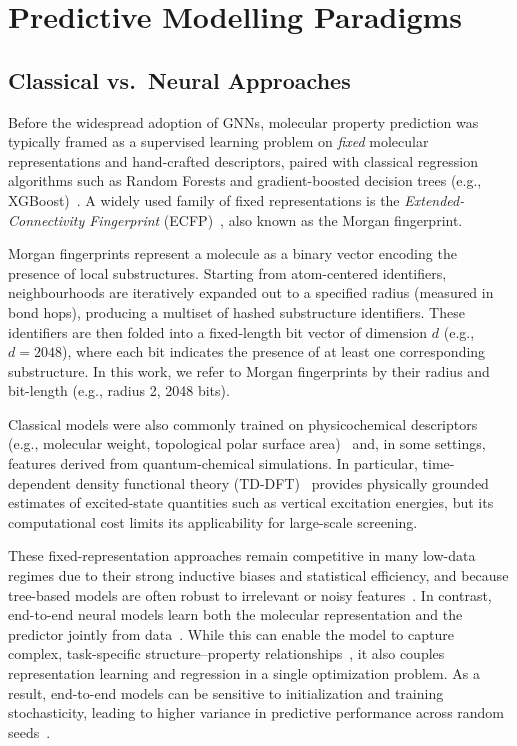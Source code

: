 \section{Predictive Modelling Paradigms}

\subsection{Classical vs.\ Neural Approaches}

Before the widespread adoption of GNNs, molecular property prediction was typically framed as a supervised learning problem on \emph{fixed} molecular representations and hand-crafted descriptors, paired with classical regression algorithms such as Random Forests and gradient-boosted decision trees (e.g., XGBoost)~\cite{breiman2001random, friedman2001greedy, chen2016xgboost}. A widely used family of fixed representations is the \emph{Extended-Connectivity Fingerprint} (ECFP)~\cite{rogers2010extended}, also known as the Morgan fingerprint. 

Morgan fingerprints represent a molecule as a binary vector encoding the presence of local substructures. Starting from atom-centered identifiers, neighbourhoods are iteratively expanded out to a specified radius (measured in bond hops), producing a multiset of hashed substructure identifiers. These identifiers are then folded into a fixed-length bit vector of dimension $d$ (e.g., $d=2048$), where each bit indicates the presence of at least one corresponding substructure. In this work, we refer to Morgan fingerprints by their radius and bit-length (e.g., radius 2, 2048 bits).

Classical models were also commonly trained on physicochemical descriptors (e.g., molecular weight, topological polar surface area)~\cite{mauri2020alvadesc} and, in some settings, features derived from quantum-chemical simulations. In particular, time-dependent density functional theory (TD-DFT)~\cite{casida1995time} provides physically grounded estimates of excited-state quantities such as vertical excitation energies, but its computational cost limits its applicability for large-scale screening.

These fixed-representation approaches remain competitive in many low-data regimes due to their strong inductive biases and statistical efficiency, and because tree-based models are often robust to irrelevant or noisy features~\cite{grinsztajn2022tree}. In contrast, end-to-end neural models learn both the molecular representation and the predictor jointly from data~\cite{wu2018moleculenet}. While this can enable the model to capture complex, task-specific structure--property relationships~\cite{ju2021machine}, it also couples representation learning and regression in a single optimization problem. As a result, end-to-end models can be sensitive to initialization and training stochasticity, leading to higher variance in predictive performance across random seeds~\cite{chuang2020debiased}.

